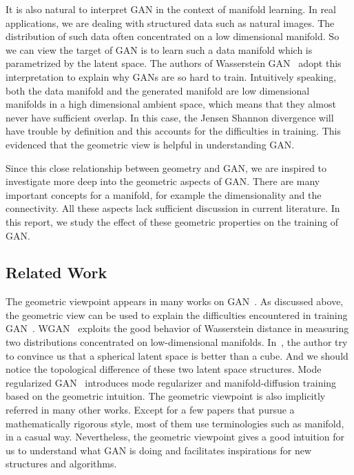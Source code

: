 It is also natural to interpret GAN
in the context of manifold learning.
In real applications,
we are dealing with structured data
such as natural images.
The distribution of such data often concentrated on a low dimensional manifold.
So we can view the target of GAN is to learn such a data manifold
which is parametrized by the latent space.
The authors of Wasserstein GAN~\cite{arjovsky2017towards,arjovsky2017wasserstein}
adopt this interpretation to explain why GANs are so hard to train.
Intuitively speaking,
both the data manifold and the generated manifold are
low dimensional manifolds in a high dimensional ambient space,
which means that they almost never have sufficient overlap.
In this case,
the Jensen Shannon divergence will have trouble by definition
and this accounts for the difficulties in training.
This evidenced that the geometric view is helpful in understanding GAN.

Since this close relationship between geometry and GAN,
we are inspired to investigate more deep into the geometric aspects of GAN.
There are many important concepts for a manifold,
for example the dimensionality and the connectivity.
All these aspects lack sufficient discussion in current literature.
In this report,
we study the effect of these geometric properties on the training of GAN.

\subsection{Related Work}

The geometric viewpoint appears in many works on
GAN~\cite{arjovsky2017towards,zhao2016energy,
arjovsky2017wasserstein,che2016mode,zhu2017unpaired,zhu2016generative}.
As discussed above,
the geometric view can be used to explain the difficulties encountered in
training GAN~\cite{arjovsky2017towards}.
WGAN~\cite{arjovsky2017wasserstein} exploits the good behavior of
Wasserstein distance in measuring two distributions concentrated on
low-dimensional manifolds.
In~\cite{white2016sampling},
the author try to convince us that a spherical latent space is
better than a cube.
And we should notice the topological difference of
these two latent space structures.
Mode regularized GAN~\cite{che2016mode} introduces mode regularizer and
manifold-diffusion training based on the geometric intuition.
The geometric viewpoint is also implicitly referred in many other works.
Except for a few papers that pursue a mathematically rigorous style,
most of them use terminologies such as manifold,
in a casual way.
Nevertheless,
the geometric viewpoint gives a good intuition for us to understand
what GAN is doing and facilitates inspirations for new structures and algorithms.

